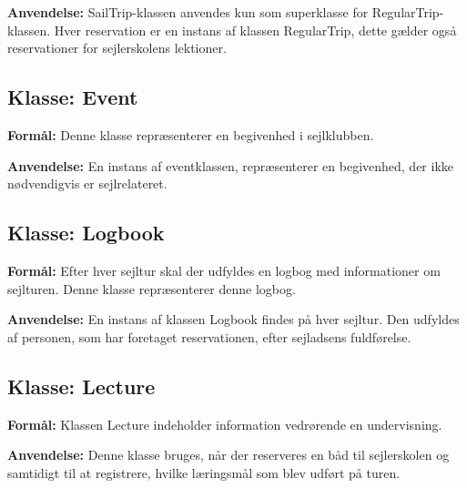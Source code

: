 \textbf{Anvendelse:}
SailTrip-klassen anvendes kun som superklasse for RegularTrip-klassen. 
Hver reservation er en instans af klassen RegularTrip, dette gælder også reservationer for sejlerskolens lektioner.

\subsection*{Klasse: Event}

\textbf{Formål:} 
Denne klasse repræsenterer en begivenhed i sejlklubben.

\textbf{Anvendelse:}
En instans af eventklassen, repræsenterer en begivenhed, der ikke nødvendigvis er sejlrelateret.

\subsection*{Klasse: Logbook}

\textbf{Formål:}
Efter hver sejltur skal der udfyldes en logbog med informationer om sejlturen. 
Denne klasse repræsenterer denne logbog.

\textbf{Anvendelse:}
En instans af klassen Logbook findes på hver sejltur. 
Den udfyldes af personen, som har foretaget reservationen, efter sejladsens fuldførelse. 

\subsection*{Klasse: Lecture}

\textbf{Formål:}
Klassen Lecture indeholder information vedrørende en undervisning. 

\textbf{Anvendelse:}
Denne klasse bruges, når der reserveres en båd til sejlerskolen og samtidigt til at registrere, hvilke læringsmål som blev udført på turen. 

